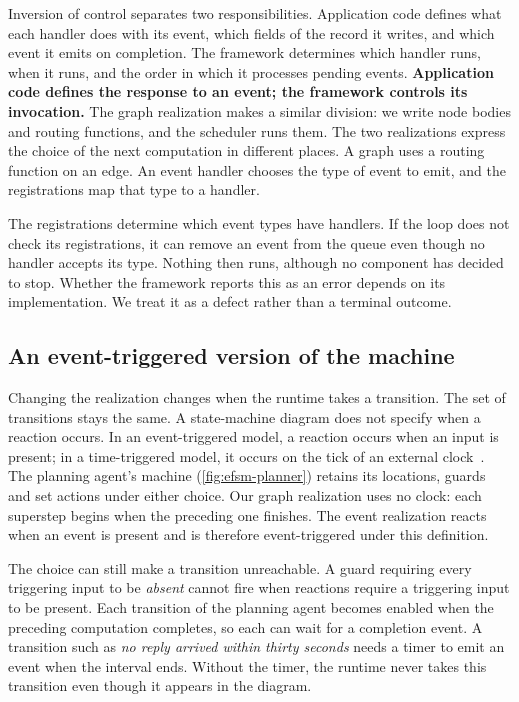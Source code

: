 Inversion of control separates two responsibilities. Application code defines what each handler
does with its event, which fields of the record it writes, and which event it emits on completion.
The framework determines which handler runs, when it runs, and the order in which it processes
pending events. \textbf{Application code defines the response to an event; the framework controls
its invocation.} The graph realization makes a similar division: we write node bodies and routing
functions, and the scheduler runs them. The two realizations express the choice of the next
computation in different places. A graph uses a routing function on an edge. An event handler
chooses the type of event to emit, and the registrations map that type to a handler.

The registrations determine which event types have handlers. If the loop does not check its
registrations, it can remove an event from the queue even though no handler accepts its type.
Nothing then runs, although no component has decided to stop. Whether the framework reports this
as an error depends on its implementation. We treat it as a defect rather than a terminal
outcome.

\subsection{An event-triggered version of the machine}
\label{sec:events-machine}

Changing the realization changes when the runtime takes a transition. The set of transitions stays
the same. A state-machine diagram does not specify when a reaction occurs. In an event-triggered
model, a reaction occurs when an input is present; in a time-triggered model, it occurs on the tick of an
external clock~\citep[slides~23--25]{seshia2015discrete}. The planning agent's machine
(\cref{fig:efsm-planner}) retains its locations, guards and set actions under either choice.
Our graph realization uses no clock: each superstep begins when the preceding one finishes. The
event realization reacts when an event is present and is therefore event-triggered under this
definition.

The choice can still make a transition unreachable. A guard requiring every triggering input to be
\emph{absent} cannot fire when reactions require a triggering input to be present. Each transition
of the planning agent becomes enabled when the preceding computation completes, so each can wait
for a completion event. A transition such as \emph{no reply
arrived within thirty seconds} needs a timer to emit an event when the interval ends. Without the
timer, the runtime never takes this transition even though it appears in the diagram.

